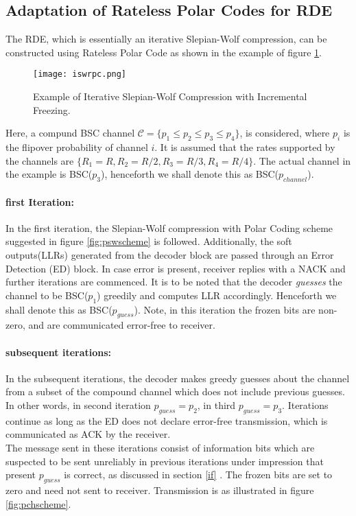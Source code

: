 \documentclass[
11pt, %
a4paper, %
oneside, %
headinclude,footinclude, %
BCOR5mm, %
]{scrartcl}
\begin{document}
\subsection{Adaptation of Rateless Polar Codes for RDE} 
The RDE, which is essentially an iterative Slepian-Wolf compression, can be constructed using Rateless Polar Code as shown in the example of figure \ref{fig:iswrpc}.
\begin{figure}[h]
 \begin{center}
    \texttt{[image: iswrpc.png]}
  \end{center}
  \caption{Example of Iterative Slepian-Wolf Compression with Incremental Freezing.}
  \label{fig:iswrpc}
\end{figure} 
Here, a compund BSC channel $\mathcal{C}=\{ p_1 \leq p_2 \leq p_3 \leq p_4\}$, is considered, where $p_i$ is the flipover probability of channel $i$. It is assumed that the rates supported by the channels are $\{ R_1=R, R_2= R/2,R_3= R/3,R_4= R/4\}$. The actual channel in the example is BSC($p_3$), henceforth we shall denote this as BSC($p_{channel}$).\\
\paragraph{first Iteration:} In the first iteration, the Slepian-Wolf compression with Polar Coding scheme suggested in figure \ref{fig:pswscheme} is followed. Additionally, the soft outputs(LLRs) generated from the decoder block are passed through an Error Detection (ED) block. In case error is present, receiver replies with a NACK and further iterations are commenced. It is to be noted that the decoder \emph{guesses} the channel to be BSC($p_1$) greedily and computes LLR accordingly. Henceforth we shall denote this as BSC($p_{guess}$). Note, in this iteration the frozen bits are non-zero, and are communicated error-free to receiver.
\paragraph{subsequent iterations:}In the subsequent iterations, the decoder makes greedy guesses about the channel from a subset of the compound channel which does not include previous guesses. In other words, in second iteration $p_{guess}=p_2$, in third $p_{guess}=p_3$. Iterations continue as long as the ED does not declare error-free transmission, which is communicated as ACK by the receiver.\\
The message sent in these iterations consist of information bits which are suspected to be sent unreliably in previous iterations under impression that present $p_{guess}$ is correct, as discussed in section \ref{if} . The frozen bits are set to zero and need not sent to receiver. Transmission is as illustrated in figure \ref{fig:pchscheme}.
\end{document}
